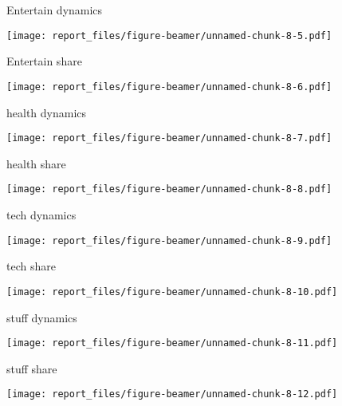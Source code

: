 \documentclass[ignorenonframetext,]{beamer}
\begin{document}
\begin{frame}{Entertain dynamics}
\protect\hypertarget{entertain-dynamics}{}

\texttt{[image: report\_files/figure-beamer/unnamed-chunk-8-5.pdf]}

\end{frame}

\begin{frame}{Entertain share}
\protect\hypertarget{entertain-share}{}

\texttt{[image: report\_files/figure-beamer/unnamed-chunk-8-6.pdf]}

\end{frame}

\begin{frame}{health dynamics}
\protect\hypertarget{health-dynamics}{}

\texttt{[image: report\_files/figure-beamer/unnamed-chunk-8-7.pdf]}

\end{frame}

\begin{frame}{health share}
\protect\hypertarget{health-share}{}

\texttt{[image: report\_files/figure-beamer/unnamed-chunk-8-8.pdf]}

\end{frame}

\begin{frame}{tech dynamics}
\protect\hypertarget{tech-dynamics}{}

\texttt{[image: report\_files/figure-beamer/unnamed-chunk-8-9.pdf]}

\end{frame}

\begin{frame}{tech share}
\protect\hypertarget{tech-share}{}

\texttt{[image: report\_files/figure-beamer/unnamed-chunk-8-10.pdf]}

\end{frame}

\begin{frame}{stuff dynamics}
\protect\hypertarget{stuff-dynamics}{}

\texttt{[image: report\_files/figure-beamer/unnamed-chunk-8-11.pdf]}

\end{frame}

\begin{frame}{stuff share}
\protect\hypertarget{stuff-share}{}

\texttt{[image: report\_files/figure-beamer/unnamed-chunk-8-12.pdf]}

\end{frame}
\end{document}
